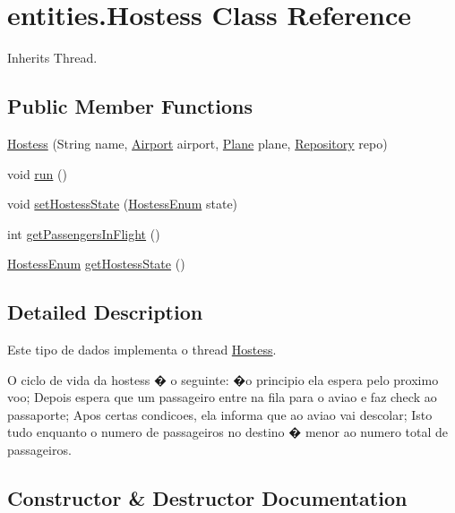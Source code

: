 \hypertarget{classentities_1_1_hostess}{}\section{entities.\+Hostess Class Reference}
\label{classentities_1_1_hostess}


Inherits Thread.

\subsection*{Public Member Functions}
\begin{DoxyCompactItemize}
\item 
\hyperlink{classentities_1_1_hostess_af5fd5cb79ab98e980c15cd09d3576801}{Hostess} (String name, \hyperlink{classshared_regions_1_1_airport}{Airport} airport, \hyperlink{classshared_regions_1_1_plane}{Plane} plane, \hyperlink{classshared_regions_1_1_repository}{Repository} repo)
\item 
void \hyperlink{classentities_1_1_hostess_a509c1f1c96b0a760860884592c7babd8}{run} ()
\item 
void \hyperlink{classentities_1_1_hostess_ade5532fba6e9d58853c575ded4006507}{set\+Hostess\+State} (\hyperlink{enumentities_1_1_hostess_enum}{Hostess\+Enum} state)
\item 
int \hyperlink{classentities_1_1_hostess_af9d14239c4536df5a3975700d4c853fb}{get\+Passengers\+In\+Flight} ()
\item 
\hyperlink{enumentities_1_1_hostess_enum}{Hostess\+Enum} \hyperlink{classentities_1_1_hostess_acee3f8042f80e5252e6ed73255117d4e}{get\+Hostess\+State} ()
\end{DoxyCompactItemize}


\subsection{Detailed Description}
Este tipo de dados implementa o thread \hyperlink{classentities_1_1_hostess}{Hostess}.

O ciclo de vida da hostess � o seguinte\+:  �o principio ela espera pelo proximo voo;  Depois espera que um passageiro entre na fila para o aviao e faz check ao passaporte;  Apos certas condicoes, ela informa que ao aviao vai descolar;  Isto tudo enquanto o numero de passageiros no destino � menor ao numero total de passageiros. 

\subsection{Constructor \& Destructor Documentation}
\mbox{\label{classentities_1_1_hostess_af5fd5cb79ab98e980c15cd09d3576801}} 
